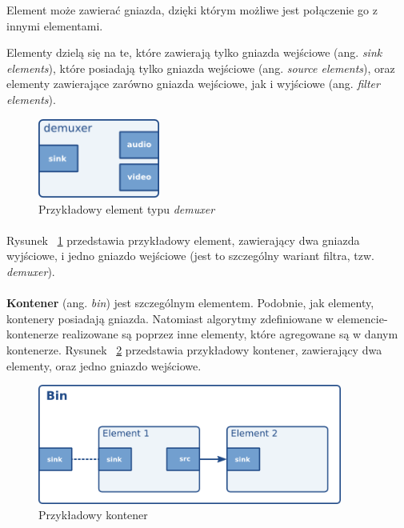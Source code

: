 \documentclass[12pt]{article}
\begin{document}
Element może zawierać gniazda, dzięki którym możliwe jest połączenie go z innymi elementami.

Elementy dzielą się na te, które zawierają tylko gniazda wejściowe (ang. \textit{sink elements}), które posiadają tylko gniazda wejściowe (ang. \textit{source elements}), oraz elementy zawierające zarówno gniazda wejściowe, jak i wyjściowe (ang. \textit{filter elements}).
\begin{figure}[H]
  \includegraphics[width=40mm]{img/sample-demuxer.png}
  \caption{Przykładowy element typu \textit{demuxer} \cite{gstmainpage}}
  \label{fig:sampleDemuxer}
\end{figure}
\paragraph{}
Rysunek ~\ref{fig:sampleDemuxer} przedstawia przykładowy element, zawierający dwa gniazda wyjściowe, i jedno gniazdo wejściowe (jest to szczególny wariant filtra, tzw. \textit{demuxer}).
\paragraph{}
\textbf{Kontener} (ang. \textit{bin}) jest szczególnym elementem. Podobnie, jak elementy, kontenery posiadają gniazda. Natomiast algorytmy zdefiniowane w elemencie-kontenerze realizowane są poprzez inne elementy, które agregowane są w danym kontenerze. Rysunek ~\ref{fig:sampleBin} przedstawia przykładowy kontener, zawierający dwa elementy, oraz jedno gniazdo wejściowe.
\begin{figure}[H]
  \includegraphics[width=100mm]{img/sample-bin.png}
  \caption{Przykładowy kontener \cite{gstmainpage}}
  \label{fig:sampleBin}
\end{figure}
\end{document}
